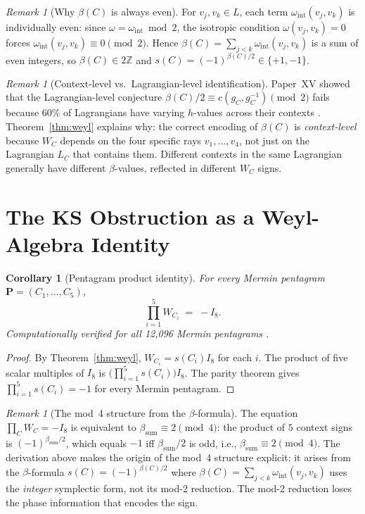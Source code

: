\documentclass[11pt,a4paper]{article}
\newtheorem{corollary}[theorem]{Corollary}
\theoremstyle{remark}
\newtheorem{remark}[theorem]{Remark}
\begin{document}
\begin{remark}[Why $\beta(C)$ is always even]\label{rem:betaeven}
For $v_j, v_k \in L$, each term $\omega_{\mathrm{int}}(v_j,v_k)$ is
individually even: since $\omega = \omega_{\mathrm{int}} \bmod 2$,
the isotropic condition $\omega(v_j,v_k) = 0$ forces
$\omega_{\mathrm{int}}(v_j,v_k) \equiv 0 \pmod 2$.
Hence $\beta(C) = \sum_{j<k} \omega_{\mathrm{int}}(v_j,v_k)$ is a
sum of even integers, so $\beta(C) \in 2\mathbb{Z}$ and
$s(C) = (-1)^{\beta(C)/2} \in \{+1,-1\}$.
\end{remark}

\begin{remark}[Context-level vs.\ Lagrangian-level identification]
Paper~XV showed that the Lagrangian-level conjecture
$\beta(C)/2 \equiv c(g_C, g_C^{-1}) \pmod 2$ fails because 60\% of
Lagrangians have varying $h$-values across their contexts \cite{PaperXV}.
Theorem~\ref{thm:weyl} explains why: the correct encoding of $\beta(C)$
is \emph{context-level} because $W_C$ depends on the four specific rays
$v_1, \ldots, v_4$, not just on the Lagrangian $L_C$ that contains them.
Different contexts in the same Lagrangian generally have different
$\beta$-values, reflected in different $W_C$ signs.
\end{remark}


\section{The KS Obstruction as a Weyl-Algebra Identity}\label{sec:ks}

\begin{corollary}[Pentagram product identity]\label{cor:pent}
For every Mermin pentagram $\mathbf{P} = (C_1, \ldots, C_5)$,
\[
  \prod_{i=1}^{5} W_{C_i} \;=\; -I_8.
\]
Computationally verified for all 12{,}096 Mermin pentagrams
\cite{PaperXVIsuppl}.
\end{corollary}

\begin{proof}
By Theorem~\ref{thm:weyl}, $W_{C_i} = s(C_i) I_8$ for each $i$.
The product of five scalar multiples of $I_8$ is
$\bigl(\prod_{i=1}^5 s(C_i)\bigr) I_8$.
The parity theorem \cite{PaperXI} gives $\prod_{i=1}^5 s(C_i) = -1$
for every Mermin pentagram.
\end{proof}

\begin{remark}[The mod~4 structure from the $\beta$-formula]
The equation $\prod_C W_C = -I_8$ is equivalent to $\beta_{\mathrm{sum}} \equiv 2 \pmod 4$:
the product of $5$ context signs is $(-1)^{\beta_{\mathrm{sum}}/2}$,
which equals $-1$ iff $\beta_{\mathrm{sum}}/2$ is odd, i.e., $\beta_{\mathrm{sum}} \equiv 2 \pmod 4$.
The derivation above makes the origin of the mod~4 structure explicit:
it arises from the $\beta$-formula $s(C) = (-1)^{\beta(C)/2}$ where
$\beta(C) = \sum_{j<k} \omega_{\mathrm{int}}(v_j, v_k)$ uses the
\emph{integer} symplectic form, not its mod-2 reduction.
The mod-2 reduction loses the phase information that encodes the sign.
\end{remark}
\end{document}
